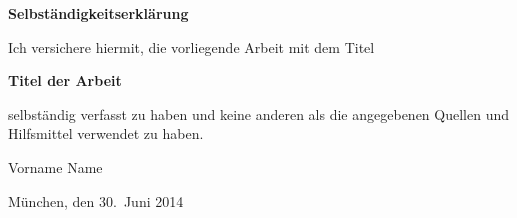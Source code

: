 \documentclass[a4paper,11pt,twoside,openright]{report}
\begin{document}
    


    


    


    




    \cleardoublepage
    \printbibliography


    \begin{appendix}
        
    \end{appendix}


    \clearpage{\pagestyle{empty}\cleardoublepage}
    \thispagestyle{empty}
    \vspace*{1cm}
    {\huge \textbf{Selbständigkeitserklärung}}\\
    \vspace*{1.5cm}

    Ich versichere hiermit, die vorliegende Arbeit mit dem Titel

    \begin{center}
        \textbf{Titel der Arbeit}
    \end{center}

    selbständig verfasst zu haben und keine anderen als die angegebenen Quellen und Hilfsmittel verwendet zu haben.

    \vspace*{3cm}

    Vorname Name

    \vspace*{1cm}
    München, den 30.~Juni 2014
\end{document}
